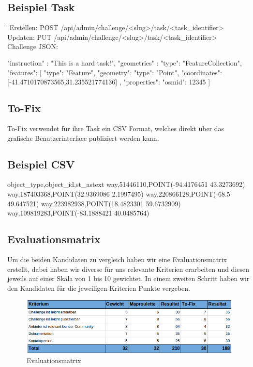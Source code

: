 \subsection*{Beispiel Task}
\begin{tabbing}
    \hspace*{4cm}\=\hspace*{5cm}\= \kill
    Erstellen: \> POST /api/admin/challenge/<slug>/task/<task\_identifier> \\
    Updaten: \> PUT /api/admin/challenge/<slug>/task/<task\_identifier> \\
    Challenge JSON: \\
\end{tabbing}
\begin{python}
{ 
  "instruction" : "This is a hard task!",
  "geometries" : {
    "type": "FeatureCollection",
    "features": [
      { "type": "Feature",
        "geometry": 
        { "type": "Point", 
          "coordinates":[-41.4710170873565,31.235521774136]
        },
        "properties": {"osmid": 12345}
      }
    ]
  }
}
\end{python}	

\subsection{To-Fix}
To-Fix verwendet für ihre Task ein CSV Format, welches direkt über das grafische Benutzerinterface publiziert werden kann.
\subsection*{Beispiel CSV}
\begin{python}
object_type,object_id,st_astext
way,51446110,POINT(-94.4176451 43.3273692)
way,187403368,POINT(32.9369086 2.1997495)
way,220866128,POINT(-68.5 49.647521)
way,223982938,POINT(18.4823301 59.6732909)
way,109819283,POINT(-83.1888421 40.0485764)
\end{python}


\subsection{Evaluationsmatrix}
Um die beiden Kandidaten zu vergleich haben wir eine Evaluationsmatrix erstellt, dabei haben wir diverse für uns relevante Kriterien erarbeiten und diesen jeweils auf einer Skala von 1 bis 10 gewichtet.
In einem zweiten Schritt haben wir den Kandidaten für die jeweiligen Kriterien Punkte vergeben.

\begin{figure}[ht]
\includegraphics[width=\textwidth]{images/croud_evol_matrix.png}
\caption[Evaluationsmatrix]{Evaluationsmatrix}
\end{figure}

